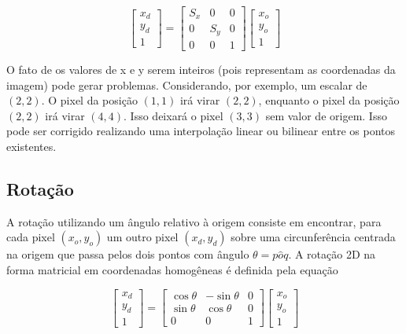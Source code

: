 \documentclass[12pt,oneside,a4paper,english,french,spanish,brazil,]{abntex2}
\begin{document}
\[
\begin{bmatrix}
x_d\\ 
y_d\\ 
1
\end{bmatrix}
=
\begin{bmatrix}
S_x & 0 & 0\\ 
0 & S_y & 0\\ 
0 & 0 & 1
\end{bmatrix}
\begin{bmatrix}
x_o\\ 
y_o\\ 
1
\end{bmatrix}
\]

O fato de os valores de x e y serem inteiros (pois representam as coordenadas da imagem) pode gerar problemas. Considerando, por exemplo, um escalar de \((2,2)\). O pixel da posição \((1,1)\) irá virar \((2,2)\), enquanto o pixel da posição \((2,2)\) irá virar \((4,4)\). Isso deixará o pixel \((3,3)\) sem valor de origem. Isso pode ser corrigido realizando uma interpolação linear ou bilinear entre os pontos existentes.

\subsection{Rotação}

A rotação utilizando um ângulo  relativo à origem consiste em encontrar, para cada pixel \((x_o,y_o)\) um outro pixel \((x_d,y_d)\) sobre uma circunferência centrada na origem que passa pelos dois pontos com ângulo \(\theta=p \hat{o} q\). A rotação 2D na forma matricial em coordenadas homogêneas é definida pela equação



\[
\begin{bmatrix}
x_d\\ 
y_d\\ 
1
\end{bmatrix}
=
\begin{bmatrix}
\cos{\theta} & -\sin{\theta} & 0\\ 
\sin{\theta} & \cos{\theta} & 0\\ 
0 & 0 & 1
\end{bmatrix}
\begin{bmatrix}
x_o\\ 
y_o\\ 
1
\end{bmatrix}
\]
\end{document}
